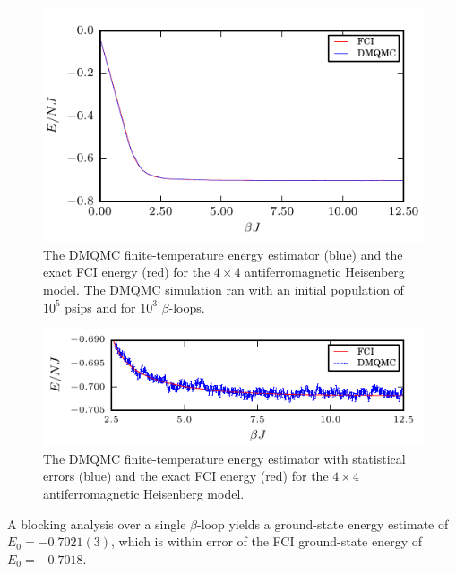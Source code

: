 \begin{figure}[H]
\begin{center}
\includegraphics[width =1\textwidth]{4x4_nois_energy.pdf}
\caption[The DMQMC finite-temperature energy estimator for the $4\times4$ antiferromagnetic Heisenberg model.]{The DMQMC finite-temperature energy estimator (blue) and the exact FCI energy (red) for the $4\times4$ antiferromagnetic Heisenberg model. The DMQMC simulation ran with an initial population of $10^5$ psips and for $10^3$ $\beta$-loops. }
\label{fig:4x4_nois_energy}
\end{center}
\end{figure}
\begin{figure}[H]
\begin{center}
\includegraphics[width =1\textwidth]{4x4_energy_subplot.pdf}
\caption[The DMQMC energy estimator for the $4\times4$ antiferromagnetic Heisenberg model.]{The DMQMC finite-temperature energy estimator with statistical errors (blue) and the exact FCI energy (red) for the $4\times4$ antiferromagnetic Heisenberg model.}
\label{fig:4x4_nois_energy_subplot}
\end{center}
\end{figure}

A blocking analysis over a single $\beta$-loop yields a ground-state energy estimate of $E_0 = -0.7021(3)$, which is within error of the FCI ground-state energy\cite{SpencerFCI} of $E_0 = -0.7018$.


